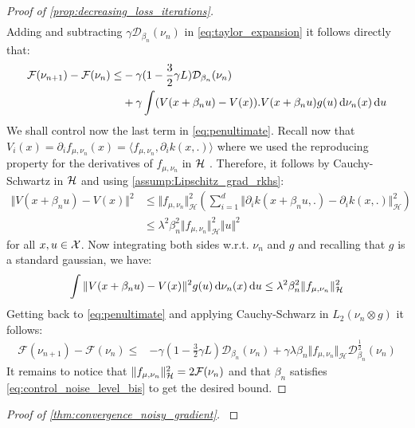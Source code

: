 \begin{proof}[Proof of \cref{prop:decreasing_loss_iterations}]
\begin{align}
	\end{align} 
Adding and subtracting  $\gamma \mathcal{D}_{\beta_n}(\nu_n)$ in \cref{eq:taylor_expansion} it follows directly that:
\begin{align}\label{eq:penultimate}
\begin{split}
			\mathcal{F}(\nu_{n+1})-\mathcal{F}(\nu_{n} )\leq &   -\gamma (1-\frac{3}{2}\gamma L )\mathcal{D}_{\beta_n}(\nu_n)
 \\
 &+ \gamma\int  (V(x+\beta_n u) -V(x)).V(x+\beta_n u) g(u)\mathop{}\!\mathrm{d}\nu_n(x)\mathop{}\!\mathrm{d} u	
\end{split}
\end{align}
We shall control now the last term in \cref{eq:penultimate}. Recall now that  $ V_i(x) = \partial_i f_{\mu,\nu_n}(x) = \langle f_{\mu,\nu_n} , \partial_i k(x,.)\rangle $ where we used the reproducing property for the derivatives of $f_{\mu,\nu_n}$ in ${{\mathcal H}}$ . Therefore, it follows by Cauchy-Schwartz in ${{\mathcal H}}$ and using \cref{assump:Lipschitz_grad_rkhs}:
\begin{align*}
\Vert V(x+\beta_n u) -V(x)\Vert^2
&\leq 
\Vert f_{\mu,\nu_n} \Vert_{\mathcal{H}}^2  \left( \sum_{i=1}^{d}\Vert \partial_i k(x+\beta_n u,.) -\partial_i k(x,.)\Vert^2_{\mathcal{H}}\right)\\
&\leq \lambda^2\beta_n^2
\Vert   f_{\mu,\nu_n}\Vert_{\mathcal{H}}^2\Vert u \Vert^2 
\end{align*}
for all $ x,u \in {{\mathcal X}}$. Now integrating both sides w.r.t. $\nu_n$ and $g$ and recalling that $g$ is a standard gaussian, we have:
\begin{align}
	 \int  \Vert V(x+\beta_n u) -V(x)\Vert^2 g(u)\mathop{}\!\mathrm{d}\nu_n(x)\mathop{}\!\mathrm{d} u
\leq 
	\lambda^2\beta^2_n\Vert f_{\mu,\nu_n} \Vert_{\mathcal{H}}^2
\end{align}
Getting back to \cref{eq:penultimate} and applying Cauchy-Schwarz in $L_2(\nu_n\otimes g)$ it follows:
\begin{align}
	\mathcal{F}(\nu_{n+1})-\mathcal{F}(\nu_{n} )\leq &   -\gamma (1-\frac{3}{2}\gamma L )\mathcal{D}_{\beta_n}(\nu_n) +\gamma \lambda\beta_n\Vert f_{\mu,\nu_n} \Vert_{\mathcal{H}}\mathcal{D}^{\frac{1}{2}}_{\beta_n}(\nu_n)
\end{align}
It remains to notice that $\Vert f_{\mu,\nu_n} \Vert_{\mathcal{H}}^2 = 2{{\mathcal F}}(\nu_n)$ and that $\beta_n$ satisfies \cref{eq:control_noise_level_bis} to get the desired bound.
\end{proof}

\begin{proof}[Proof of \cref{thm:convergence_noisy_gradient}]\label{proof:thm:convergence_noisy_gradient}
\end{proof}





